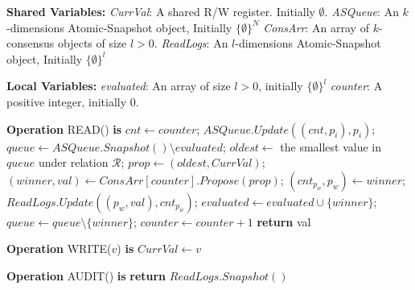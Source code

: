 \documentclass[11pt]{article}
\theoremstyle{definition}
\begin{document}
\begin{algorithm}
    \caption{A wait-free implementation of an auditable register with $k$-readers and a general amount of writers/auditors}
    \label{alg:auditableRegs}
    \begin{algorithmic}[1]
    
    \Statex \textbf{Shared Variables:}
    \Statex \hspace{1em} \textit{CurrVal}: A shared R/W register. Initially $\emptyset$.
    \Statex \hspace{1em} \textit{ASQueue}: An $k$-dimensions Atomic-Snapshot object, Initially $\{\emptyset\}^N$
    \Statex \hspace{1em} \textit{ConsArr}: An array of $k$-consensus objects of size $l>0$.
    \Statex \hspace{1em} \textit{ReadLogs}:  An $l$-dimensions Atomic-Snapshot object, Initially $\{\emptyset\}^l$
    
    \Statex
    \Statex \textbf{Local Variables:} \hfill {}
    \Statex \hspace{1em} \textit{evaluated}: An array of size $l>0$, initially  $\{\emptyset\}^l$
    \Statex \hspace{1em} \textit{counter}: A positive integer, initially $0$.
    
    \Statex
    \Statex \textbf{Operation} READ() \textbf{is}
    \State $cnt \leftarrow counter$;
    \State $ASQueue.Update((cnt, p_i), p_i)$;
    \State $queue\leftarrow ASQueue.Snapshot() \setminus evaluated$;
        \State $oldest\leftarrow$ the smallest value in $queue$ under relation $\mathcal{R}$;
        \State $prop \leftarrow (oldest, CurrVal)$;
        \State $(winner, val) \leftarrow ConsArr[counter].Propose(prop)$;
        \State $(cnt_{p_w},p_w) \leftarrow winner$;
        \State $ReadLogs.Update((p_w, val), cnt_{p_w})$;
        \State $evaluated\leftarrow evaluated \cup \{winner\}$;
        \State $queue\leftarrow queue \setminus \{winner\}$;
        \State $counter \leftarrow counter + 1$
    \EndWhile
    \State \textbf{return} val

    \Statex
    \Statex \textbf{Operation} WRITE($v$) \textbf{is} \hfill {}
    \State $CurrVal \leftarrow v$


    \Statex
    \Statex \textbf{Operation} AUDIT() \textbf{is} \hfill {}
    \State \textbf{return} $ReadLogs.Snapshot()$

    \end{algorithmic}
\end{algorithm}
\end{document}
